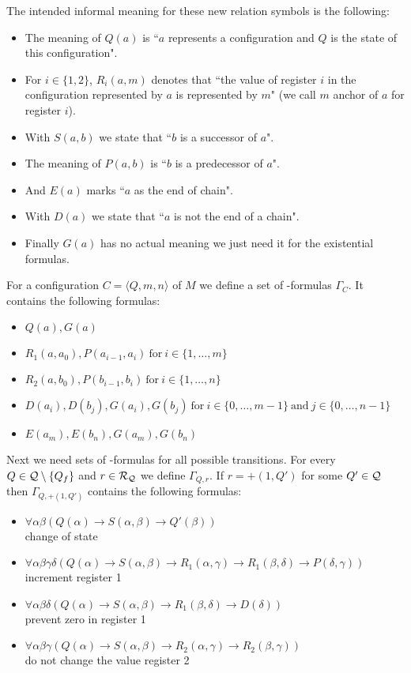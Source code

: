 The intended informal meaning for these new relation symbols is the following:
\begin{itemize}
	\item The meaning of $Q(a)$ is ``$a$ represents a configuration and $Q$ is the state of this configuration".
	\item  For $i\in\{1,2\}$, $R_i(a,m)$ denotes that ``the value of register $i$ in the configuration represented by $a$ is represented by $m$" (we call $m$ anchor of $a$ for register $i$).
	\item With $S(a,b)$ we state that ``$b$ is a successor of $a$".
	\item The meaning of $P(a,b)$ is ``$b$ is a predecessor of $a$".
	\item And $E(a)$ marks ``$a$ as the end of chain".
	\item With $D(a)$ we state that ``$a$ is not the end of a chain".
	\item Finally $G(a)$ has no actual meaning we just need it for the existential formulas. %
\end{itemize}
For a configuration $C=\langle Q,m,n\rangle$ of $M$ we define a set of \SysP-formulas $\Gamma_C$. It contains the following formulas:
\begin{itemize}
	\item $Q(a),G(a)$
	\item $R_1(a,a_0),P(a_{i-1},a_i)~\text{for}~i\in\{1,\dots,m\}$
	\item $R_2(a,b_0),P(b_{i-1},b_i)~\text{for}~i\in\{1,\dots,n\}$
	\item $D(a_i),D(b_j),G(a_i),G(b_j)~\text{for}~i\in\{0,\dots,m-1\}~\text{and}~j\in\{0,\dots,n-1\}$
	\item $E(a_m),E(b_n),G(a_m),G(b_n)$
\end{itemize}
Next we need sets of \SysP-formulas for all possible transitions.
For every $Q\in\mathcal{Q}\setminus\{Q_f\}$ and $r\in\mathcal{R}_{\mathcal{Q}}$ we define $\Gamma_{Q,r}$.
If $r=+(1,Q')$ for some $Q'\in\mathcal{Q}$ then $\Gamma_{Q,+(1,Q')}$ contains the following formulas:
\begin{itemize}
	\item $\forall\alpha\beta(Q(\alpha)\to S(\alpha,\beta)\to Q'(\beta))$ \\change of state
	\item $\forall\alpha\beta\gamma\delta(Q(\alpha)\to S(\alpha,\beta)\to R_1(\alpha,\gamma)\to R_1(\beta,\delta)\to P(\delta,\gamma))$\\increment register 1
	\item $\forall\alpha\beta\delta(Q(\alpha)\to S(\alpha,\beta)\to R_1(\beta,\delta)\to D(\delta))$ \\prevent zero in register 1
	\item $\forall\alpha\beta\gamma(Q(\alpha)\to S(\alpha,\beta)\to R_2(\alpha,\gamma)\to R_2(\beta,\gamma))$ \\do not change the value register 2
\end{itemize}

